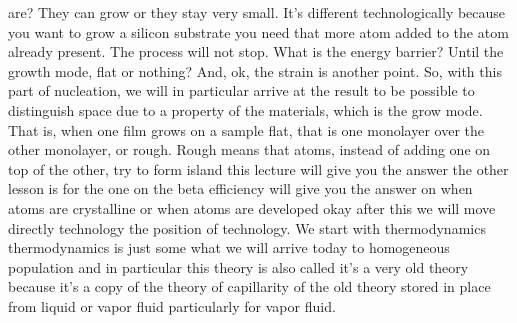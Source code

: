 are? They can grow or they stay very small. It's different technologically because you want to grow a silicon substrate you need that more atom added to the atom already present. The process will not stop. What is the energy barrier? Until the growth mode, flat or nothing? And, ok, the strain is another point. So, with this part of nucleation, we will in particular arrive at the result to be possible to distinguish space due to a property of the materials, which is the grow mode. That is, when one film grows on a sample flat, that is one monolayer over the other monolayer, or rough. Rough means that atoms, instead of adding one on top of the other, try to form island this lecture will give you the answer the other lesson is for the one on the beta efficiency will give you the answer on when atoms are crystalline or when atoms are developed okay after this we will move directly technology the position of technology.
We start with thermodynamics thermodynamics is just some what we will arrive today to homogeneous population and in particular this theory is also called it's a very old theory because it's a copy of the theory of capillarity of the old theory stored in place from liquid or vapor fluid particularly for vapor fluid.
